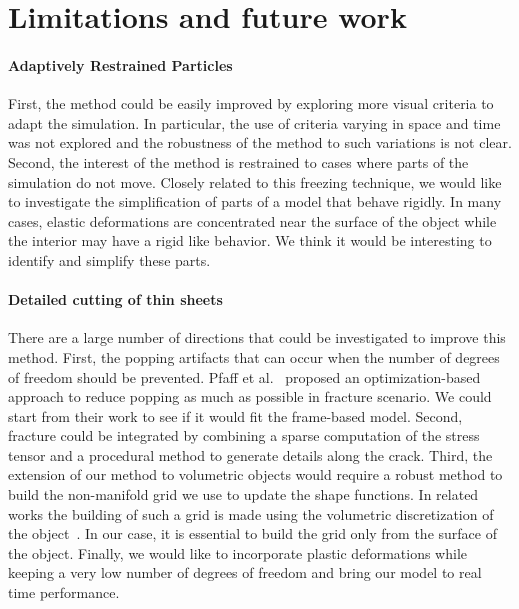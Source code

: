 \section{Limitations and future work}

\paragraph{Adaptively Restrained Particles} First, the method could be easily improved by exploring more visual criteria to adapt the simulation. 
In particular, the use of criteria varying in space and time was not explored and the robustness of the method to such variations is not clear. 
Second, the interest of the method is restrained to cases where parts of the simulation do not move. 
Closely related to this freezing technique, we would like to investigate the simplification of parts of a model that behave rigidly. 
In many cases, elastic deformations are concentrated near the surface of the object while the interior may have a rigid like behavior. 
We think it would be interesting to identify and simplify these parts.

\paragraph{Detailed cutting of thin sheets} There are a large number of directions that could be investigated to improve this method. 
First, the popping artifacts that can occur when the number of degrees of freedom should be prevented. 
Pfaff et al.~\cite{Pfaff2014} proposed an optimization-based approach to reduce popping as much as possible in fracture scenario.
We could start from their work to see if it would fit the frame-based model.
Second, fracture could be integrated by combining a sparse computation of the stress tensor and a procedural method to generate details along the crack. 
Third, the extension of our method to volumetric objects would require a robust method to build the non-manifold grid we use to update the shape functions. 
In related works the building of such a grid is made using the volumetric discretization of the object~\cite{Mitchell2015a,Mitchell2015b}. 
In our case, it is essential to build the grid only from the surface of the object. 
Finally, we would like to incorporate plastic deformations while keeping a very low number of degrees of freedom and bring our model to real time performance.

